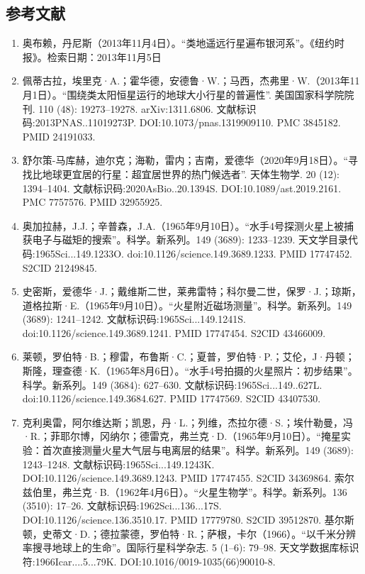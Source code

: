 \subsection{参考文献}
\begin{enumerate}
\item 奥布赖，丹尼斯（2013年11月4日）。“类地遥远行星遍布银河系”。《纽约时报》。检索日期：2013年11月5日
\item 佩蒂古拉，埃里克·A.；霍华德，安德鲁·W.；马西，杰弗里·W.（2013年11月1日）。“围绕类太阳恒星运行的地球大小行星的普遍性”. 美国国家科学院院刊. 110 (48): 19273–19278. arXiv:1311.6806. 文献标识码:2013PNAS..11019273P. DOI:10.1073/pnas.1319909110. PMC 3845182. PMID 24191033.
\item 舒尔策-马库赫，迪尔克；海勒，雷内；吉南，爱德华（2020年9月18日）。“寻找比地球更宜居的行星：超宜居世界的热门候选者”. 天体生物学. 20 (12): 1394–1404. 文献标识码:2020AsBio..20.1394S. DOI:10.1089/ast.2019.2161. PMC 7757576. PMID 32955925.
\item 奥加拉赫，J.J.；辛普森，J.A.（1965年9月10日）。“水手4号探测火星上被捕获电子与磁矩的搜索”。科学。新系列。149 (3689): 1233–1239. 天文学目录代码:1965Sci...149.1233O. doi:10.1126/science.149.3689.1233. PMID 17747452. S2CID 21249845.
\item 史密斯，爱德华·J.；戴维斯二世，莱弗雷特；科尔曼二世，保罗·J.；琼斯，道格拉斯·E.（1965年9月10日）。“火星附近磁场测量”。科学。新系列。149 (3689): 1241–1242. 文献标识码:1965Sci...149.1241S. doi:10.1126/science.149.3689.1241. PMID 17747454. S2CID 43466009.
\item 莱顿，罗伯特·B.；穆雷，布鲁斯·C.；夏普，罗伯特·P.；艾伦，J·丹顿；斯隆，理查德·K.（1965年8月6日）。“水手4号拍摄的火星照片：初步结果”。科学。新系列。149 (3684): 627–630. 文献标识码:1965Sci...149..627L. doi:10.1126/science.149.3684.627. PMID 17747569. S2CID 43407530.
\item 克利奥雷，阿尔维达斯；凯恩，丹·L.；列维，杰拉尔德·S.；埃什勒曼，冯·R.；菲耶尔博，冈纳尔；德雷克，弗兰克·D.（1965年9月10日）。“掩星实验：首次直接测量火星大气层与电离层的结果”。科学。新系列。149 (3689): 1243–1248. 文献标识码:1965Sci...149.1243K. DOI:10.1126/science.149.3689.1243. PMID 17747455. S2CID 34369864.
 索尔兹伯里，弗兰克·B.（1962年4月6日）。“火星生物学”。科学。新系列。136 (3510): 17–26. 文献标识码:1962Sci...136...17S. DOI:10.1126/science.136.3510.17. PMID 17779780. S2CID 39512870.
 基尔斯顿，史蒂文·D.；德拉蒙德，罗伯特·R.；萨根，卡尔（1966）。“以千米分辨率搜寻地球上的生命”。国际行星科学杂志. 5 (1–6): 79–98. 天文学数据库标识符:1966Icar....5...79K. DOI:10.1016/0019-1035(66)90010-8.

\end{enumerate}
